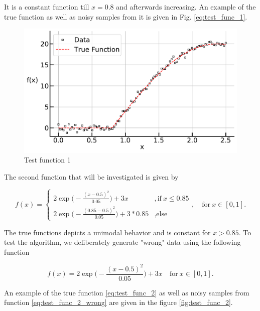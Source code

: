 \documentclass[10pt,a4paper]{article}
\begin{document}
It is a constant function till $x=0.8$ and afterwards increasing. An example of the true function as well as noisy samples from it is given in Fig. \ref{eq:test_func_1}.

\begin{figure}[H]
	\centering
	\includegraphics[width=\columnwidth]{../thesisplots/exp_inc1_data.pdf}
	\caption{Test function 1}
	\label{fig:test_func_1}
\end{figure}

The second function that will be investigated is given by

\begin{equation} \label{eq:test_func_2}
	f(x) = \begin{cases}
					2\exp \big(-\frac{(x-0.5)^2}{0.05} \big) + 3x  &,\text{if} \ x \le 0.85 \\
					2\exp \big(-\frac{(0.85-0.5)^2}{0.05} \big) + 3*0.85  &,\text{else}
	       \end{cases}, \quad \text{for} \ x \in [0,1]. 	
\end{equation}

The true functions depicts a unimodal behavior and is constant for $x > 0.85$. To test the algorithm, we deliberately generate "wrong" data using the following function

\begin{equation} \label{eq:test_func_2_wrong}
	f(x) = 2\exp \big(-\frac{(x-0.5)^2}{0.05} \big) + 3x  \quad \text{for} \ x \in [0, 1]. 
\end{equation}

An example of the true function \ref{eq:test_func_2} as well as noisy samples from function \ref{eq:test_func_2_wrong} are given in the figure \ref{fig:test_func_2}.
\end{document}
